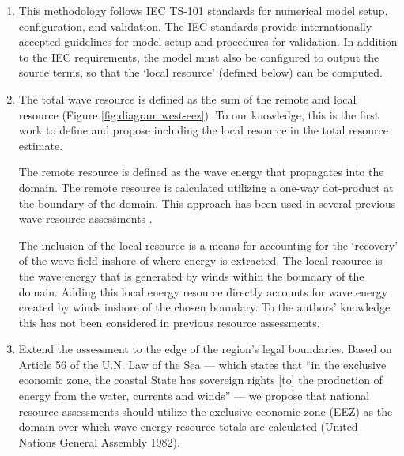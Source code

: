 \begin{enumerate}
    \item This methodology follows IEC TS-101 standards for numerical model setup, configuration, and validation. The IEC standards provide internationally accepted guidelines for model setup and procedures for validation. In addition to the IEC requirements, the model must also be configured to output the source terms, so that the `local resource' (defined below) can be computed.
    
    \item The total wave resource is defined as the sum of the remote and local resource (Figure \ref{fig:diagram:west-eez}). To our knowledge, this is the first work to define and propose including the local resource in the total resource estimate.
    
    The remote resource is defined as the wave energy that propagates into the domain. The remote resource is calculated utilizing a one-way dot-product at the boundary of the domain. This approach has been used in several previous wave resource assessments \citep{gunnQuantifyingGlobalWave2012, hemerRevisedAssessmentAustralia2017, regueroGlobalWavePower2015}.
    
     The inclusion of the local resource is a means for accounting for the `recovery' of the wave-field inshore of where energy is extracted. The local resource is the wave energy that is generated by winds within the boundary of the domain. Adding this local energy resource directly accounts for wave energy created by winds inshore of the chosen boundary. To the authors' knowledge this has not been considered in previous resource assessments.

    \item Extend the assessment to the edge of the region's legal boundaries. Based on Article 56 of the U.N. Law of the Sea — which states that ``in the exclusive economic zone, the coastal State has sovereign rights [to] the production of energy from the water, currents and winds'' — we propose that national resource assessments should utilize the exclusive economic zone (EEZ) as the domain over which wave energy resource totals are calculated (United Nations General Assembly 1982). 
\end{enumerate}

